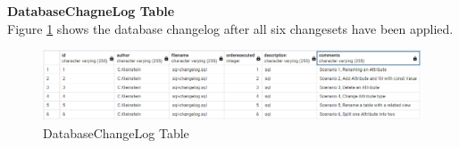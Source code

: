 \textbf{DatabaseChagneLog Table}\\
%
Figure \ref{fig:scenarios:LiquibaseDBCLYAML} shows the database changelog after all six changesets have been applied.

\begin{figure}[H]
	\centering
	\includegraphics[width=\textwidth]{./chapters/scenarios/images/databasechangelogSQL}
	\caption[DatabaseChangeLog Table - Source: Own illustration]{DatabaseChangeLog Table}
	\label{fig:scenarios:LiquibaseDBCLYAML}
\end{figure}

\newpage